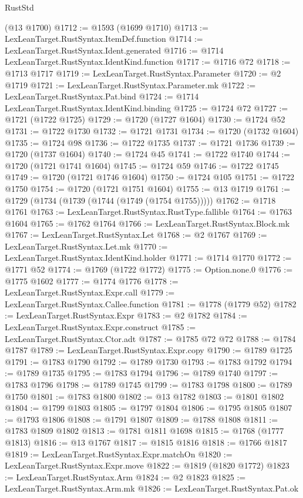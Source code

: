 \begin{lexlean}{RustStd}
\begin{coremodule}
    (@13 @1700)
@1712 := @1593 (@1699 @1710)
@1713 := LexLeanTarget.RustSyntax.ItemDef.function
@1714 := LexLeanTarget.RustSyntax.Ident.generated
@1716 := @1714 LexLeanTarget.RustSyntax.IdentKind.function
@1717 := @1716 @72
@1718 := @1713 @1717
@1719 := LexLeanTarget.RustSyntax.Parameter
@1720 := @2 @1719
@1721 := LexLeanTarget.RustSyntax.Parameter.mk
@1722 := LexLeanTarget.RustSyntax.Pat.bind
@1724 := @1714 LexLeanTarget.RustSyntax.IdentKind.binding
@1725 := @1724 @72
@1727 := @1721 (@1722 @1725)
@1729 := @1720 (@1727 @1604)
@1730 := @1724 @52
@1731 := @1722 @1730
@1732 := @1721 @1731
@1734 := @1720 (@1732 @1604)
@1735 := @1724 @98
@1736 := @1722 @1735
@1737 := @1721 @1736
@1739 := @1720 (@1737 @1604)
@1740 := @1724 @45
@1741 := @1722 @1740
@1744 := @1720 (@1721 @1741 @1604)
@1745 := @1724 @59
@1746 := @1722 @1745
@1749 := @1720 (@1721 @1746 @1604)
@1750 := @1724 @105
@1751 := @1722 @1750
@1754 := @1720 (@1721 @1751 @1604)
@1755 := @13 @1719
@1761 := @1729 (@1734 (@1739 (@1744 (@1749 (@1754 @1755)))))
@1762 := @1718 @1761
@1763 := LexLeanTarget.RustSyntax.RustType.fallible
@1764 := @1763 @1604
@1765 := @1762 @1764
@1766 := LexLeanTarget.RustSyntax.Block.mk
@1767 := LexLeanTarget.RustSyntax.Let
@1768 := @2 @1767
@1769 := LexLeanTarget.RustSyntax.Let.mk
@1770 := LexLeanTarget.RustSyntax.IdentKind.holder
@1771 := @1714 @1770
@1772 := @1771 @52
@1774 := @1769 (@1722 @1772)
@1775 := Option.none.{0}
@1776 := @1775 @1602
@1777 := @1774 @1776
@1778 := LexLeanTarget.RustSyntax.Expr.call
@1779 := LexLeanTarget.RustSyntax.Callee.function
@1781 := @1778 (@1779 @52)
@1782 := LexLeanTarget.RustSyntax.Expr
@1783 := @2 @1782
@1784 := LexLeanTarget.RustSyntax.Expr.construct
@1785 := LexLeanTarget.RustSyntax.Ctor.adt
@1787 := @1785 @72 @72
@1788 := @1784 @1787
@1789 := LexLeanTarget.RustSyntax.Expr.copy
@1790 := @1789 @1725
@1791 := @1783 @1790
@1792 := @1789 @1730
@1793 := @1783 @1792
@1794 := @1789 @1735
@1795 := @1783 @1794
@1796 := @1789 @1740
@1797 := @1783 @1796
@1798 := @1789 @1745
@1799 := @1783 @1798
@1800 := @1789 @1750
@1801 := @1783 @1800
@1802 := @13 @1782
@1803 := @1801 @1802
@1804 := @1799 @1803
@1805 := @1797 @1804
@1806 := @1795 @1805
@1807 := @1793 @1806
@1808 := @1791 @1807
@1809 := @1788 @1808
@1811 := @1783 @1809 @1802
@1813 := @1781 @1811 @1698
@1815 := @1768 (@1777 @1813)
@1816 := @13 @1767
@1817 := @1815 @1816
@1818 := @1766 @1817
@1819 := LexLeanTarget.RustSyntax.Expr.matchOn
@1820 := LexLeanTarget.RustSyntax.Expr.move
@1822 := @1819 (@1820 @1772)
@1823 := LexLeanTarget.RustSyntax.Arm
@1824 := @2 @1823
@1825 := LexLeanTarget.RustSyntax.Arm.mk
@1826 := LexLeanTarget.RustSyntax.Pat.ok

\end{coremodule}
\end{lexlean}

